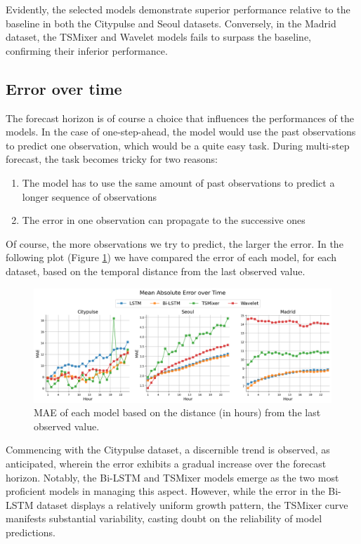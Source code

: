 Evidently, the selected models demonstrate superior performance relative to the baseline in both the Citypulse and Seoul datasets. Conversely, in the Madrid dataset, the TSMixer and Wavelet models fails to surpass the baseline, confirming their inferior performance.

\subsection{Error over time}

The forecast horizon is of course a choice that influences the performances of the models. In the case of one-step-ahead, the model would use the past observations to predict one observation, which would be a quite easy task. During multi-step forecast, the task becomes tricky for two reasons:
\begin{enumerate}
    \item The model has to use the same amount of past observations to predict a longer sequence of observations
    \item The error in one observation can propagate to the successive ones
\end{enumerate}

Of course, the more observations we try to predict, the larger the error.
In the following plot (Figure \ref{fig:mae-per-hour}) we have compared the error of each model, for each dataset, based on the temporal distance from the last observed value.

\begin{figure}
    \centering
    \includegraphics[width=1\linewidth]{images/Results/mae_per_hour.png}
    \caption{MAE of each model based on the distance (in hours) from the last observed value.}
    \label{fig:mae-per-hour}
\end{figure}

Commencing with the Citypulse dataset, a discernible trend is observed, as anticipated, wherein the error exhibits a gradual increase over the forecast horizon. Notably, the Bi-LSTM and TSMixer models emerge as the two most proficient models in managing this aspect. However, while the error in the Bi-LSTM dataset displays a relatively uniform growth pattern, the TSMixer curve manifests substantial variability, casting doubt on the reliability of model predictions.

